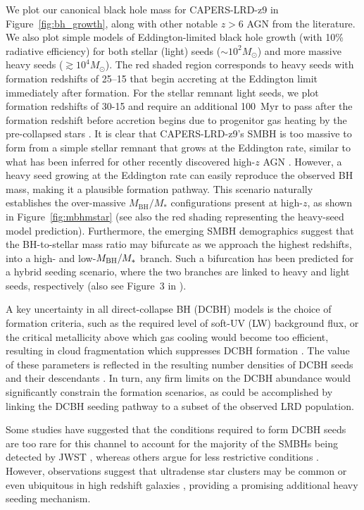 \documentclass[twocolumn]{aastex7}
\newcommand{\src}{CAPERS-LRD-z9}
\begin{document}
We plot our canonical black hole mass for \src{} in Figure~\ref{fig:bh_growth}, along with other notable $z>6$ AGN from the literature. We also plot simple models of Eddington-limited black hole growth (with 10\% radiative efficiency) for both stellar (light) seeds ($\sim10^2 M_{\odot}$) and more massive heavy seeds ($\gtrsim10^4 M_{\odot}$). The red shaded region corresponds to heavy seeds with formation redshifts of 25--15 that begin accreting at the Eddington limit immediately after formation. For the stellar remnant light seeds, we plot formation redshifts of 30-15 and require an additional 100~Myr to pass after the formation redshift before accretion begins due to progenitor gas heating by the pre-collapsed stars \citep[e.g.,][]{Johnson2007}. It is clear that \src{}'s SMBH is too massive to form from a simple stellar remnant that grows at the Eddington rate, similar to what has been inferred for other recently discovered high-$z$ AGN \citep[e.g.,][]{larson23}. However, a heavy seed growing at the Eddington rate can easily reproduce the observed BH mass, making it a plausible formation pathway. This scenario naturally establishes the over-massive $M_\textrm{BH}/M_*$ configurations present at high-$z$, as shown in Figure~\ref{fig:mbhmstar} (see also the red shading representing the heavy-seed model prediction).
Furthermore, the emerging SMBH demographics suggest that the BH-to-stellar mass ratio may bifurcate as we approach the highest redshifts, into a high- and low-$M_{\rm BH}/M_{\ast}$ branch. Such a bifurcation has been predicted for a hybrid seeding scenario, where the two branches are linked to heavy and light seeds, respectively (also see Figure~3 in \citealt{Jeon_BHMF2025}).

A key uncertainty in all direct-collapse BH (DCBH) models is the choice of formation criteria, such as the required level of soft-UV (LW) background flux, or the critical metallicity above which gas cooling would become too efficient, resulting in cloud fragmentation which suppresses DCBH formation \citep[e.g.][]{Bromm_Loeb_2003,Begelman2006,omukai08,Wise_DCBH2019}. The value of these parameters is reflected in the resulting number densities of DCBH seeds and their descendants \citep[e.g.,][]{Trinca_CAT2022,Hu_BHMF2025,Jeon_BHMF2025}. In turn, any firm limits on the DCBH abundance would significantly constrain the formation scenarios, as could be accomplished by linking the DCBH seeding pathway to a subset of the observed LRD population. 

Some studies have suggested that the conditions required to form DCBH seeds are too rare for this channel to account for the majority of the SMBHs being detected by JWST \citep[e.g.,][]{Bhowmick_SMBH2024}, whereas others argue for less restrictive conditions \citep[e.g.,][]{Chon_DCBH2025}. However, observations suggest that ultradense star clusters may be common or even ubiquitous in high redshift galaxies \citep{Adamo2024,Mowla2024,Fujimotograpes2024}, providing a promising additional heavy seeding mechanism.
\end{document}
